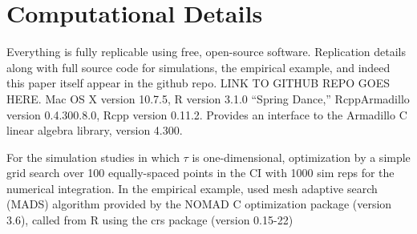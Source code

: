 \section{Computational Details}
\label{append:comp}
Everything is fully replicable using free, open-source software.
Replication details along with full source code for simulations, the empirical example, and indeed this paper itself appear in the github repo.
LINK TO GITHUB REPO GOES HERE.
Mac OS X version 10.7.5, R version 3.1.0 ``Spring Dance,'' RcppArmadillo version 0.4.300.8.0, Rcpp version 0.11.2.
Provides an interface to the Armadillo C\raisebox{0.5ex}{\tiny\textbf{++}} linear algebra library, version 4.300. 

For the simulation studies in which $\tau$ is one-dimensional, optimization by a simple grid search over 100 equally-spaced points in the CI with 1000 sim reps for the numerical integration.
In the empirical example, used mesh adaptive search (MADS) algorithm provided by the NOMAD C\raisebox{0.5ex}{\tiny\textbf{++}} optimization package (version 3.6), called from R using the crs package (version 0.15-22)